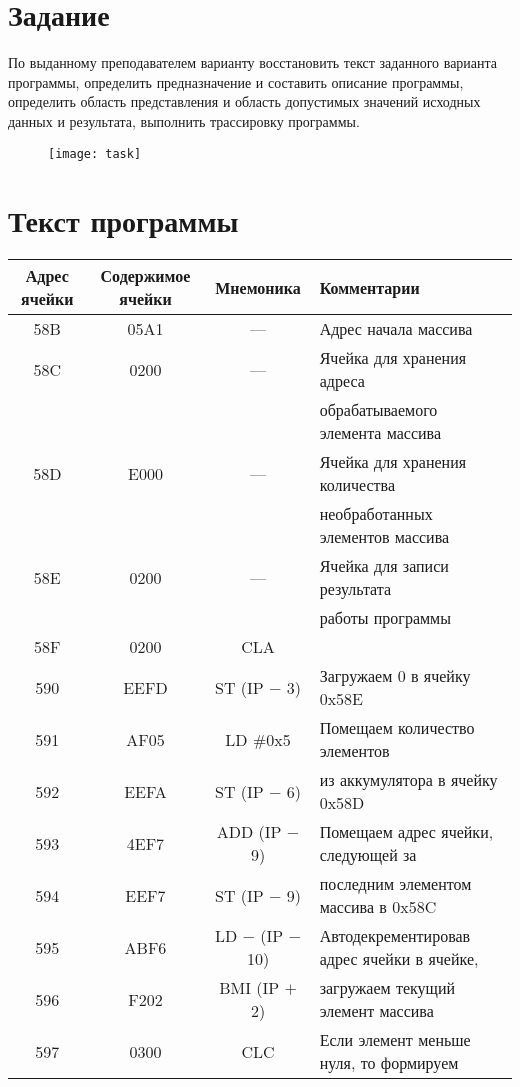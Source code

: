 \section{Задание}
По выданному преподавателем варианту восстановить текст заданного варианта программы, определить предназначение и составить описание программы, определить область представления и область допустимых значений исходных данных и результата, выполнить трассировку программы.
\begin{figure}[H]
\centering
\texttt{[image: task]}
\label{pic:task}
\end{figure}

\section{Текст программы}
\begin{center}
\begin{tabular}{|c|c|c|l|}
\hline
\textbf{Адрес ячейки} & \textbf{Содержимое ячейки} & \textbf{Мнемоника} & \textbf{Комментарии}\\
\hline
58B & 05A1 & --- & Адрес начала массива\\
58C & 0200 & --- & Ячейка для хранения адреса \\
 & & & обрабатываемого элемента массива\\
58D & E000 & --- & Ячейка для хранения количества \\
 & & &необработанных элементов массива\\
58E & 0200 & --- & Ячейка для записи результата  \\ 
& & & работы программы\\
\hline
\hline
58F & 0200 & CLA & \\
590 & EEFD & ST (IP $-$ 3) & Загружаем 0 в ячейку 0x58E\\
\hline
591 & AF05 & LD \#0x5 & Помещаем количество элементов\\
592 & EEFA & ST (IP $-$ 6) & из аккумулятора в ячейку 0x58D\\
\hline
593 & 4EF7 & ADD (IP $-$ 9) & Помещаем адрес ячейки, следующей за\\
594 & EEF7 & ST (IP $-$ 9) & последним элементом массива в 0x58C\\
\hline
595 & ABF6 & LD $-$ (IP $-$ 10) & Автодекрементировав адрес ячейки в ячейке,\\
596 & F202 & BMI (IP $+$ 2) & загружаем текущий элемент массива\\
597 & 0300 & CLC & Если элемент меньше нуля, то формируем\\

\end{tabular}
\end{center}
